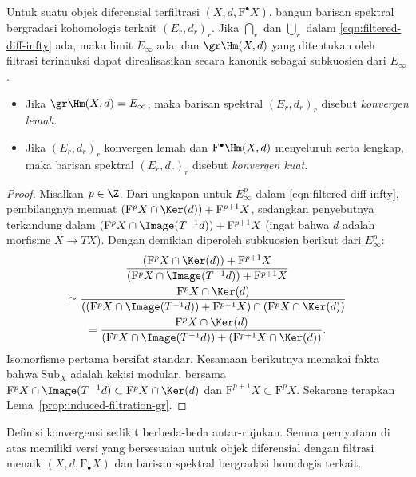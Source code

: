 \begin{definition-proposition}\label{def:diff-obj-convergence}
	Untuk suatu objek diferensial terfiltrasi
	$(X,d,\mathrm{F}^\bullet X)$, bangun barisan spektral bergradasi
	kohomologis terkait $(E_r,d_r)_r$. Jika $\bigcap_r$ dan $\bigcup_r$ dalam
	\eqref{eqn:filtered-diff-infty} ada, maka limit $E_\infty$ ada, dan
	$\gr\Hm(X,d)$ yang ditentukan oleh filtrasi terinduksi dapat direalisasikan
	secara kanonik sebagai subkuosien dari $E_\infty$.
	\begin{itemize}
		\item Jika $\gr\Hm(X,d)=E_\infty$, maka barisan spektral
		$(E_r,d_r)_r$ disebut \emph{konvergen lemah}.
		\item Jika $(E_r,d_r)_r$ konvergen lemah dan
		$\mathrm{F}^\bullet\Hm(X,d)$ menyeluruh serta lengkap, maka barisan
		spektral $(E_r,d_r)_r$ disebut \emph{konvergen kuat}.
	\end{itemize}
\end{definition-proposition}
\begin{proof}
	Misalkan $p\in\Z$. Dari ungkapan untuk $E_\infty^p$ dalam
	\eqref{eqn:filtered-diff-infty}, pembilangnya memuat
	$(\mathrm{F}^pX\cap\Ker(d))+\mathrm{F}^{p+1}X$, sedangkan penyebutnya
	terkandung dalam
	$(\mathrm{F}^pX\cap\Image(T^{-1}d))+\mathrm{F}^{p+1}X$
	(ingat bahwa $d$ adalah morfisme $X\to TX$). Dengan demikian diperoleh
	subkuosien berikut dari $E_\infty^p$:
	\begin{multline*}
		\dfrac{(\mathrm{F}^pX\cap\Ker(d))+\mathrm{F}^{p+1}X}
		{(\mathrm{F}^pX\cap\Image(T^{-1}d))+\mathrm{F}^{p+1}X} \\
		\simeq\dfrac{\mathrm{F}^pX\cap\Ker(d)}
		{((\mathrm{F}^pX\cap\Image(T^{-1}d))+\mathrm{F}^{p+1}X)
		 \cap(\mathrm{F}^pX\cap\Ker(d))} \\
		=\dfrac{\mathrm{F}^pX\cap\Ker(d)}
		{(\mathrm{F}^pX\cap\Image(T^{-1}d))
		 +(\mathrm{F}^{p+1}X\cap\Ker(d))}.
	\end{multline*}
	Isomorfisme pertama bersifat standar. Kesamaan berikutnya memakai fakta
	bahwa $\mathrm{Sub}_X$ adalah kekisi modular, bersama
	$\mathrm{F}^pX\cap\Image(T^{-1}d)
	\subset\mathrm{F}^pX\cap\Ker(d)$ dan
	$\mathrm{F}^{p+1}X\subset\mathrm{F}^pX$. Sekarang terapkan
	Lema~\ref{prop:induced-filtration-gr}.
\end{proof}

Definisi konvergensi sedikit berbeda-beda antar-rujukan.
Semua pernyataan di atas memiliki versi yang bersesuaian untuk objek
diferensial dengan filtrasi menaik $(X,d,\mathrm{F}_\bullet X)$ dan barisan
spektral bergradasi homologis terkait.
